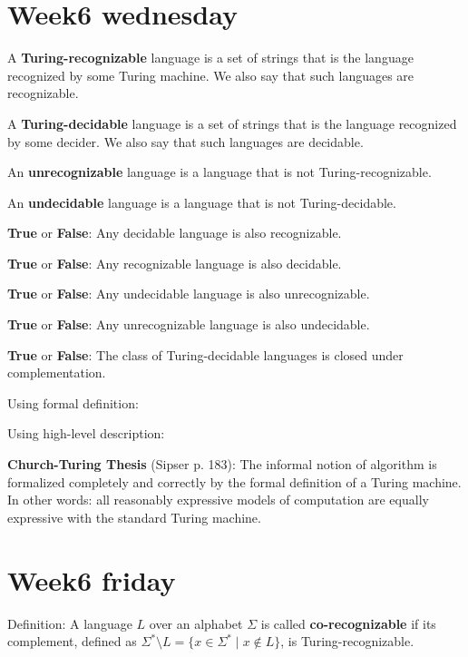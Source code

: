\documentclass[12pt, oneside]{article}
\begin{document}
 \vfill
\section*{Week6 wednesday}




A {\bf Turing-recognizable} language is a set of strings that 
is the language recognized by some Turing machine. We also 
say that such languages are recognizable.

A {\bf Turing-decidable} language is a set of strings that 
is the language recognized by some decider. We also 
say that such languages are decidable.


An {\bf unrecognizable} language is a language that is not Turing-recognizable.

An {\bf undecidable} language is a language that is not Turing-decidable.

\vfill

{\bf  True} or {\bf False}: Any  decidable language  is  also  recognizable.

\vfill

{\bf  True} or {\bf False}: Any  recognizable language  is  also  decidable.

\vfill

{\bf  True} or {\bf False}: Any  undecidable language  is  also  unrecognizable.

\vfill

{\bf  True} or {\bf False}: Any  unrecognizable language  is  also  undecidable.

\vfill

\newpage


{\bf True} or {\bf False}: The class of Turing-decidable languages is closed under complementation.

\vfill

Using formal definition:
\vfill

Using high-level description:
\vfill


{\bf  Church-Turing Thesis} (Sipser p. 183): The informal notion of algorithm is formalized completely  and correctly by the 
formal definition of a  Turing machine. In other words: all reasonably expressive models of 
computation are equally expressive with the standard Turing machine.
 \vfill
\section*{Week6 friday}



Definition: A language $L$ over an  alphabet $\Sigma$ is called {\bf co-recognizable} if its complement,  defined
as $\Sigma^* \setminus L  = \{ x  \in  \Sigma^* \mid x \notin  L \}$, is Turing-recognizable.
\end{document}

